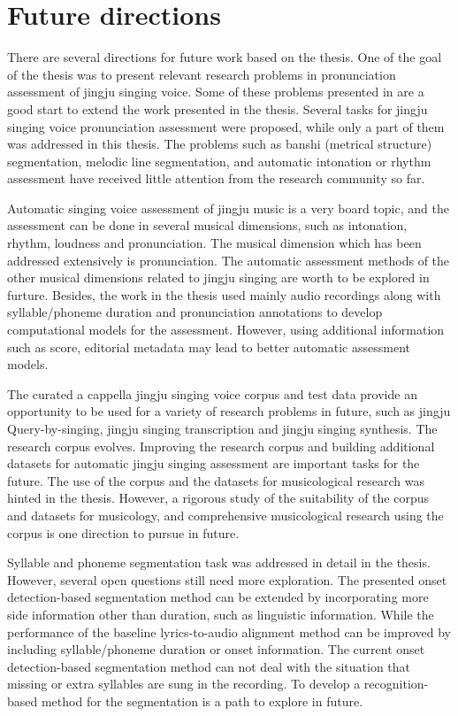\section{Future directions}

There are several directions for future work based on the thesis. One of the goal of the thesis was to present relevant research problems in pronunciation assessment of jingju singing voice. Some of these problems presented in  are a good start to extend the work presented in the thesis. Several tasks for jingju singing voice pronunciation assessment were proposed, while only a part of them was addressed in this thesis. The problems such as \gls{banshi} (metrical structure) segmentation, melodic line segmentation, and automatic intonation or rhythm assessment have received little attention from the research community so far.

Automatic singing voice assessment of jingju music is a very board topic, and the assessment can be done in several musical dimensions, such as intonation, rhythm, loudness and pronunciation. The musical dimension which has been addressed extensively is pronunciation. The automatic assessment methods of the other musical dimensions related to jingju singing are worth to be explored in furture. Besides, the work in the thesis used mainly audio recordings along with syllable/phoneme duration and pronunciation annotations to develop computational models for the assessment. However, using additional information such as score, editorial metadata may lead to better automatic assessment models.

The curated a cappella jingju singing voice corpus and test data provide an opportunity to be used for a variety of research problems in future, such as jingju Query-by-singing, jingju singing transcription and jingju singing synthesis. The research corpus evolves. Improving the research corpus and building additional datasets for automatic jingju singing assessment are important tasks for the future. The use of the corpus and the datasets for musicological research was hinted in the thesis. However, a rigorous study of the suitability of the corpus and datasets for musicology, and comprehensive musicological research using the corpus is one direction to pursue in future.

Syllable and phoneme segmentation task was addressed in detail in the thesis. However, several open questions still need more exploration. The presented onset detection-based segmentation method can be extended by incorporating more side information other than duration, such as linguistic information. While the performance of the baseline lyrics-to-audio alignment method can be improved by including syllable/phoneme duration or onset information. The current onset detection-based segmentation method can not deal with the situation that missing or extra syllables are sung in the recording. To develop a recognition-based method for the segmentation is a path to explore in future.


